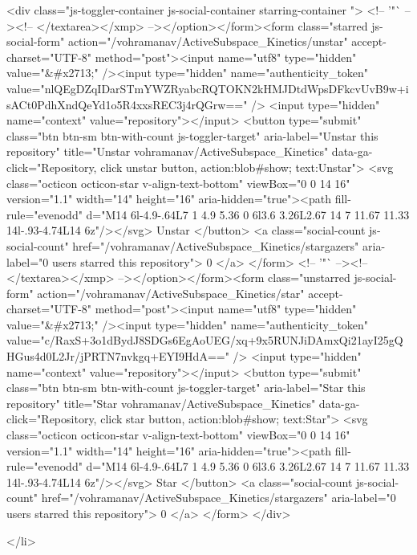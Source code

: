   <div class="js-toggler-container js-social-container starring-container ">
    <!-- '"` --><!-- </textarea></xmp> --></option></form><form class="starred js-social-form" action="/vohramanav/ActiveSubspace_Kinetics/unstar" accept-charset="UTF-8" method="post"><input name="utf8" type="hidden" value="&#x2713;" /><input type="hidden" name="authenticity_token" value="nlQEgDZqIDarSTmYWZRyabcRQTOKN2kHMJDtdWpsDFkcvUvB9w+isACt0PdhXndQeYd1o5R4xxsREC3j4rQGrw==" />
      <input type="hidden" name="context" value="repository"></input>
      <button
        type="submit"
        class="btn btn-sm btn-with-count js-toggler-target"
        aria-label="Unstar this repository" title="Unstar vohramanav/ActiveSubspace_Kinetics"
        data-ga-click="Repository, click unstar button, action:blob#show; text:Unstar">
        <svg class="octicon octicon-star v-align-text-bottom" viewBox="0 0 14 16" version="1.1" width="14" height="16" aria-hidden="true"><path fill-rule="evenodd" d="M14 6l-4.9-.64L7 1 4.9 5.36 0 6l3.6 3.26L2.67 14 7 11.67 11.33 14l-.93-4.74L14 6z"/></svg>
        Unstar
      </button>
        <a class="social-count js-social-count" href="/vohramanav/ActiveSubspace_Kinetics/stargazers"
           aria-label="0 users starred this repository">
          0
        </a>
</form>
    <!-- '"` --><!-- </textarea></xmp> --></option></form><form class="unstarred js-social-form" action="/vohramanav/ActiveSubspace_Kinetics/star" accept-charset="UTF-8" method="post"><input name="utf8" type="hidden" value="&#x2713;" /><input type="hidden" name="authenticity_token" value="c/RaxS+3o1dBydJ8SDGs6EgAoUEG/xq+9x5RUNJiDAmxQi21ayI25gQHGus4d0L2Jr/jPRTN7nvkgq+EYI9HdA==" />
      <input type="hidden" name="context" value="repository"></input>
      <button
        type="submit"
        class="btn btn-sm btn-with-count js-toggler-target"
        aria-label="Star this repository" title="Star vohramanav/ActiveSubspace_Kinetics"
        data-ga-click="Repository, click star button, action:blob#show; text:Star">
        <svg class="octicon octicon-star v-align-text-bottom" viewBox="0 0 14 16" version="1.1" width="14" height="16" aria-hidden="true"><path fill-rule="evenodd" d="M14 6l-4.9-.64L7 1 4.9 5.36 0 6l3.6 3.26L2.67 14 7 11.67 11.33 14l-.93-4.74L14 6z"/></svg>
        Star
      </button>
        <a class="social-count js-social-count" href="/vohramanav/ActiveSubspace_Kinetics/stargazers"
           aria-label="0 users starred this repository">
          0
        </a>
</form>  </div>

  </li>

